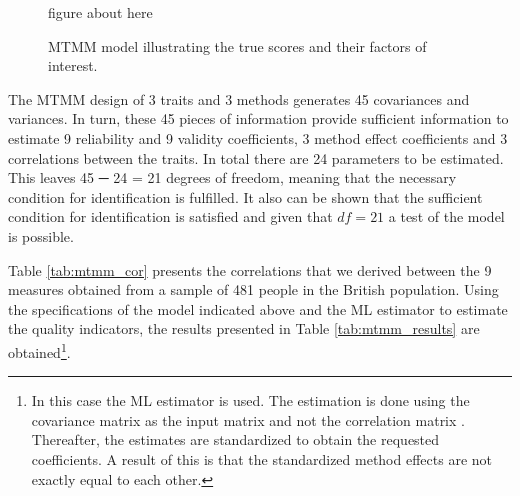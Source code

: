 \documentclass[a4paper,12pt]{article}
\begin{document}
\begin{figure}[htb]\caption{\label{fig:mtmm}MTMM model illustrating the true scores and their factors of interest.}
figure about here
\end{figure}
 
The MTMM design of 3 traits and 3 methods generates 45 covariances and variances. In turn, these 45 pieces of information provide sufficient information to estimate 9 reliability and 9 validity coefficients, 3 method effect coefficients and 3 correlations between the traits. In total there are 24 parameters to be estimated. This leaves 45 ─ 24 = 21 degrees of freedom, meaning that the necessary condition for identification is fulfilled. It also can be shown that the sufficient condition for identification is satisfied and given that $df=21$ a test of the model is possible.

Table \ref{tab:mtmm_cor} presents the correlations that we derived between the 9 measures obtained from a sample of 481 people in the British population. Using the specifications of the model indicated above and the ML estimator to estimate the quality indicators, the results presented in Table \ref{tab:mtmm_results} are obtained\footnote{In this case the ML estimator is used. The estimation is done using the covariance matrix as the input matrix and not the correlation matrix . Thereafter, the estimates are standardized to obtain the requested coefficients. A result of this is that the standardized  method effects are not exactly equal to each other.}.  
\end{document}
